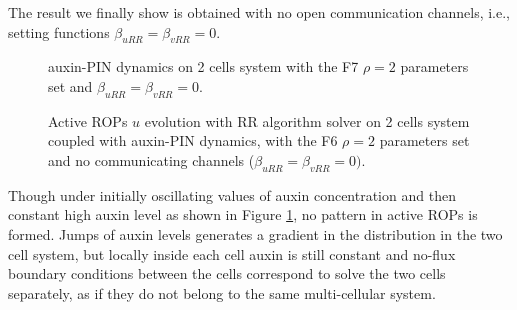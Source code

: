 The result we finally show is obtained with no open communication channels, i.e., setting functions $\beta_{uRR} = \beta_{vRR} = 0$.
\begin{figure}[H]
    \centering
    \quad
    \caption[auxin-PIN - with the F6 $\rho = 2$ set and $\beta_{uRR} = \beta_{vRR} = 0$]{auxin-PIN dynamics on 2 cells system with the F7 $\rho = 2$ parameters set and $\beta_{uRR} = \beta_{vRR} = 0$.}
    \label{fig:Uaux_beta0}
\end{figure}
 \begin{figure}[H]
     \centering
     \quad
     \quad
     \quad
     \quad
     \quad
     \quad
     \caption[2cell RR Active ROPs coupled auxin-PIN - with the F6 $\rho = 2$ set and and $\beta_{uRR} = \beta_{vRR} = 0$]{Active ROPs $u$ evolution with RR algorithm solver on 2 cells system coupled with auxin-PIN dynamics, with the F6 $\rho = 2$ parameters set and no communicating channels ($\beta_{uRR} = \beta_{vRR} = 0)$.}
     \label{fig:U_F62_beta0}
 \end{figure}

Though under initially oscillating values of auxin concentration and then constant high auxin level as shown in Figure \ref{fig:Uaux_beta0}, no pattern in active ROPs is formed. Jumps of auxin levels generates a gradient in the distribution in the two cell system, but locally inside each cell auxin is still constant and no-flux boundary conditions between the cells correspond to solve the two cells separately, as if they do not belong to the same multi-cellular system.

